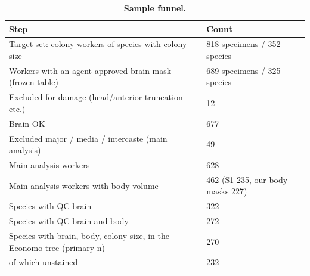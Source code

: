 \begin{table}[htbp]
\centering
\caption[Sample funnel]{\textbf{Sample funnel.}}
\label{tab:S1}
\footnotesize
\begin{tabular}{@{}>{\raggedright\arraybackslash}p{10.5cm}l@{}}
\toprule
Step & Count \\
\midrule
Target set: colony workers of species with colony size & 818 specimens / 352 species \\
Workers with an agent-approved brain mask (frozen table) & 689 specimens / 325 species \\
Excluded for damage (head/anterior truncation etc.) & 12 \\
Brain OK & 677 \\
Excluded major / media / intercaste (main analysis) & 49 \\
Main-analysis workers & 628 \\
Main-analysis workers with body volume & 462 (S1 235, our body masks 227) \\
Species with QC brain & 322 \\
Species with QC brain and body & 272 \\
Species with brain, body, colony size, in the Economo tree (primary n) & 270 \\
\quad of which unstained & 232 \\
\bottomrule
\end{tabular}
\end{table}
